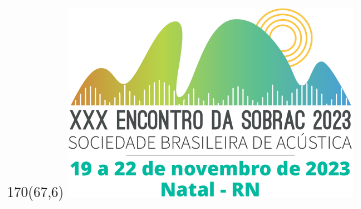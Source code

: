 \pagestyle{plain}
\thispagestyle{firststyle}
\begin{textblock}{170}(67,6)
\includegraphics[height=50mm,page=1]{Sobrac2023.pdf}
\end{textblock}

